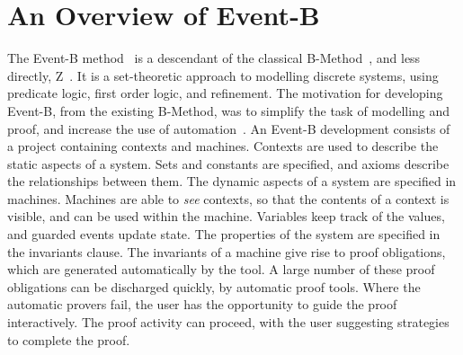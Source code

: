 \section{An Overview of Event-B}\label{OverviewEB}
The Event-B method~\cite{ ABR10} is a descendant of the classical B-Method~\cite{TheBBook}, and less directly, Z~\cite{Spivey89}. It is a set-theoretic approach to modelling discrete systems, using predicate logic, first order logic, and refinement. The motivation for developing Event-B, from the existing B-Method, was to simplify the task of modelling and proof, and increase the use of automation~\cite{Hallerstede07}. An Event-B development consists of a project containing contexts and machines. Contexts are used to describe the static aspects of a system. Sets and constants are specified, and axioms describe the relationships between them. The dynamic aspects of a system are specified in machines. Machines are able to \emph{see} contexts, so that the contents of a context is visible, and can be used within the machine. Variables keep track of the values, and guarded events update state. The properties of the system are specified in the invariants clause. The invariants of a machine give rise to proof obligations, which are generated automatically by the tool. A large number of these proof obligations can be discharged quickly, by automatic proof tools. Where the automatic provers fail, the user has the opportunity to guide the proof interactively. The proof activity can proceed, with the user suggesting strategies to complete the proof. 
%
